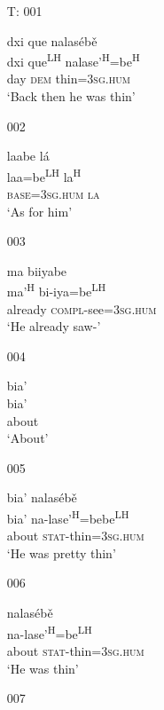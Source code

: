 

\begin{itemize}

\item[T: 001]
   
\glll dxi que nalas\'{e}b\v{e}\\
dxi que\textsuperscript{LH} nalase'\textsuperscript{H}=be\textsuperscript{H}\\
day \textsc{dem} thin=\textsc{3sg.hum}\\
\glt `Back then he was thin'


\item[002]
    
\glll laabe l\'{a}\\
laa=be\textsuperscript{LH} la\textsuperscript{H} \\
 \textsc{base}=\textsc{3sg.hum} \textsc{la}\\
\glt `As for him'
 

\item[003]
   
\glll ma biiyabe \\
ma'\textsuperscript{H} bi-iya=be\textsuperscript{LH} \\
already \textsc{compl}-see=\textsc{3sg.hum} \\
\glt `He already saw-'
 

\item[004]
   
\glll bia'\\
bia'\\
about\\
\glt `About'
 

\item[005]
   
\glll bia' nalas\'{e}b\v{e}\\
bia' na-lase'\textsuperscript{H}=bebe\textsuperscript{LH} \\
about \textsc{stat}-thin=\textsc{3sg.hum}\\
\glt `He was pretty thin' 
 

\item[006]
   
\glll nalas\'{e}b\v{e}\\
na-lase'\textsuperscript{H}=be\textsuperscript{LH} \\
about \textsc{stat}-thin=\textsc{3sg.hum}\\
\glt `He was thin'
 

\item[007]
   

\end{itemize}
